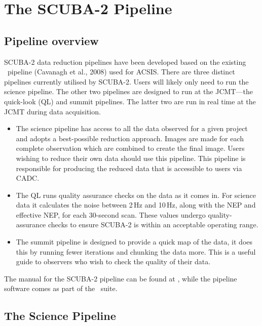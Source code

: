 \chapter{The SCUBA-2 Pipeline}
\label{sec:pipe}

\section{Pipeline overview}

SCUBA-2 data reduction pipelines have been developed based on the
existing \oracdr\ pipeline (Cavanagh et al., 2008\cite{oracdr}) used
for ACSIS. There are three distinct pipelines currently utilised by
SCUBA-2. Users will likely only need to run the science pipeline. The
other two pipelines are designed to run at the JCMT---the quick-look (QL) and
summit pipelines. The latter two are run in real time at the JCMT
during data acquisition.

\begin{itemize}
\item The science pipeline has access to all the data observed for a
given project and adopts a best-possible reduction approach. Images are
made for each complete observation which are combined to create the final
image. Users wishing to reduce their own data should use this pipeline.
This pipeline is responsible for producing the reduced data that is
accessible to users via CADC.
\item The QL runs quality assurance checks on the data as it comes in.
For science data it calculates the noise between 2\,Hz and 10\,Hz,
along with the NEP and effective NEP, for each 30-second scan. These
values undergo quality-assurance checks to ensure SCUBA-2 is within
an acceptable operating range.
\item The summit pipeline is designed to provide a quick map of the
data, it does this by running fewer iterations and chunking the data
more. This is a useful guide to observers who wish to check the
quality of their data.

\end{itemize}

The manual for the SCUBA-2 pipeline can be found at \pipelinesun,
while the pipeline software comes as part of the \starlink\ suite.


\section{The Science Pipeline}

